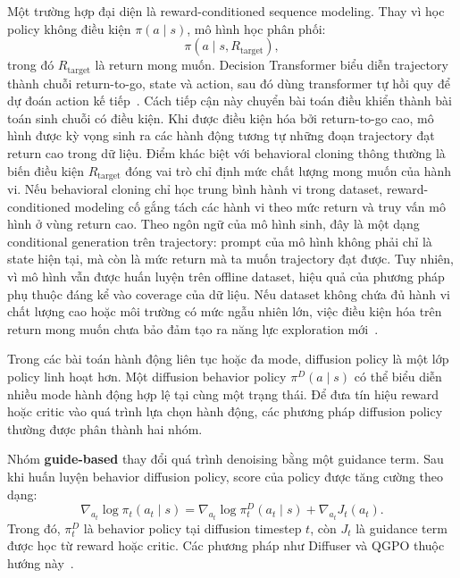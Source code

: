 Một trường hợp đại diện là reward-conditioned sequence modeling.
Thay vì học policy không điều kiện $\pi(a\mid s)$, mô hình học phân phối:
\begin{equation}
    \pi(a\mid s, R_{\text{target}}),
\end{equation}
trong đó $R_{\text{target}}$ là return mong muốn.
Decision Transformer biểu diễn trajectory thành chuỗi return-to-go, state và action, sau đó dùng transformer tự hồi quy để dự đoán action kế tiếp~\citep{chen2021decision}.
Cách tiếp cận này chuyển bài toán điều khiển thành bài toán sinh chuỗi có điều kiện.
Khi được điều kiện hóa bởi return-to-go cao, mô hình được kỳ vọng sinh ra các hành động tương tự những đoạn trajectory đạt return cao trong dữ liệu.
Điểm khác biệt với behavioral cloning thông thường là biến điều kiện $R_{\text{target}}$ đóng vai trò chỉ định mức chất lượng mong muốn của hành vi.
Nếu behavioral cloning chỉ học trung bình hành vi trong dataset, reward-conditioned modeling cố gắng tách các hành vi theo mức return và truy vấn mô hình ở vùng return cao.
Theo ngôn ngữ của mô hình sinh, đây là một dạng conditional generation trên trajectory: prompt của mô hình không phải chỉ là state hiện tại, mà còn là mức return mà ta muốn trajectory đạt được.
Tuy nhiên, vì mô hình vẫn được huấn luyện trên offline dataset, hiệu quả của phương pháp phụ thuộc đáng kể vào coverage của dữ liệu.
Nếu dataset không chứa đủ hành vi chất lượng cao hoặc môi trường có mức ngẫu nhiên lớn, việc điều kiện hóa trên return mong muốn chưa bảo đảm tạo ra năng lực exploration mới~\citep{paster2022luck}.

Trong các bài toán hành động liên tục hoặc đa mode, diffusion policy là một lớp policy linh hoạt hơn.
Một diffusion behavior policy $\pi^D(a\mid s)$ có thể biểu diễn nhiều mode hành động hợp lệ tại cùng một trạng thái.
Để đưa tín hiệu reward hoặc critic vào quá trình lựa chọn hành động, các phương pháp diffusion policy thường được phân thành hai nhóm.

Nhóm \textbf{guide-based} thay đổi quá trình denoising bằng một guidance term.
Sau khi huấn luyện behavior diffusion policy, score của policy được tăng cường theo dạng:
\begin{equation}
    \nabla_{a_t}\log \pi_t(a_t\mid s)
    =
    \nabla_{a_t}\log \pi_t^D(a_t\mid s)
    +
    \nabla_{a_t}J_t(a_t).
\end{equation}
Trong đó, $\pi_t^D$ là behavior policy tại diffusion timestep $t$, còn $J_t$ là guidance term được học từ reward hoặc critic.
Các phương pháp như Diffuser và QGPO thuộc hướng này~\citep{janner2022diffuser,lu2023qgpo}.

